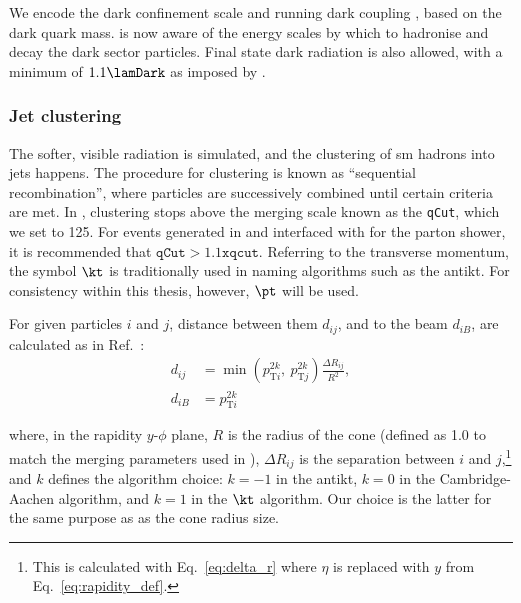 We encode the dark confinement scale \lamDark and running dark coupling \aDark, based on the dark quark mass. \PYTHIA is now aware of the energy scales by which to hadronise and decay the dark sector particles. Final state dark radiation is also allowed, with a minimum \pt of $\text{1.1}\lamDark$ as imposed by \PYTHIA.



\subsubsection{Jet clustering}
\label{svj:pythia_jet_clustering}

The softer, visible radiation is simulated, and the clustering of \acrshort{sm} hadrons into \glspl{jet} happens. The procedure for clustering is known as ``sequential recombination'', where particles are successively combined until certain criteria are met. In \PYTHIA, clustering stops above the merging scale known as the \texttt{qCut}, which we set to 125\GeV. For events generated in \MADGRAPH and interfaced with \PYTHIA for the parton shower, it is recommended that $\texttt{qCut} > 1.1 \texttt{xqcut}$. Referring to the transverse momentum, the symbol $\kt$ is traditionally used in naming algorithms such as the \gls{antikt}. For consistency within this thesis, however, $\pt$ will be used.

For given particles $i$ and $j$, distance between them $d_{ij}$, and to the beam $d_{iB}$, are calculated as in Ref.~:
\begin{equation}
    \begin{aligned}
d_{ij} &= \min(p_{\mathrm{T}i}^{2k}, \ p_{\mathrm{T}j}^{2k}) \frac{\Delta R_{ij}}{R^2},\\
d_{iB} &= p_{\mathrm{T}i}^{2k}
    \end{aligned}
    \label{eq:distances_kt_pythia}
\end{equation}

where, in the rapidity $y$-$\phi$ plane, $R$ is the radius of the cone (defined as 1.0 to match the merging parameters used in \MADGRAPH), $\Delta R_{ij}$ is the separation between $i$ and $j$,\footnote{This is calculated with Eq.~\ref{eq:delta_r} where $\eta$ is replaced with $y$ from Eq.~\ref{eq:rapidity_def}.} and $k$ defines the algorithm choice: $k = -\text{1}$ in the \gls{antikt}, $k = \text{0}$ in the Cambridge-Aachen algorithm, and $k = \text{1}$ in the $\kt$ algorithm. Our choice is the latter for the same purpose as as the cone radius size.

